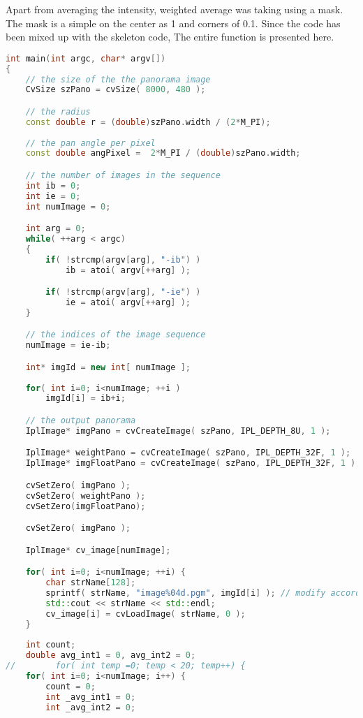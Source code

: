 \documentclass[11pt]{article}
\begin{document}
Apart from averaging the intensity, weighted average was taking using a mask. The mask is a simple on the center as 1 and corners of 0.1. Since the code has been mixed up with the skeleton code, The entire function is presented here.
\begin{lstlisting}[language=C++, caption={ImageBlending}, label=code4]
int main(int argc, char* argv[])
{
    // the size of the the panorama image
    CvSize szPano = cvSize( 8000, 480 );

    // the radius
    const double r = (double)szPano.width / (2*M_PI);
	
    // the pan angle per pixel
    const double angPixel =  2*M_PI / (double)szPano.width;

    // the number of images in the sequence
    int ib = 0;
    int ie = 0;
    int numImage = 0;

    int arg = 0;
    while( ++arg < argc) 
    {
        if( !strcmp(argv[arg], "-ib") )
            ib = atoi( argv[++arg] );

        if( !strcmp(argv[arg], "-ie") )
            ie = atoi( argv[++arg] );
    }	

    // the indices of the image sequence
    numImage = ie-ib;

    int* imgId = new int[ numImage ];
        
    for( int i=0; i<numImage; ++i )
        imgId[i] = ib+i;

    // the output panorama
    IplImage* imgPano = cvCreateImage( szPano, IPL_DEPTH_8U, 1 );

    IplImage* weightPano = cvCreateImage( szPano, IPL_DEPTH_32F, 1 );
    IplImage* imgFloatPano = cvCreateImage( szPano, IPL_DEPTH_32F, 1 );

    cvSetZero( imgPano );
    cvSetZero( weightPano );
    cvSetZero(imgFloatPano);

    cvSetZero( imgPano );

    IplImage* cv_image[numImage];

    for( int i=0; i<numImage; ++i) {
        char strName[128];
        sprintf( strName, "image%04d.pgm", imgId[i] ); // modify according to your image name
        std::cout << strName << std::endl;
        cv_image[i] = cvLoadImage( strName, 0 );
    }
        
    int count;
    double avg_int1 = 0, avg_int2 = 0;
//        for( int temp =0; temp < 20; temp++) {
    for( int i=0; i<numImage; i++) {
        count = 0;
        int _avg_int1 = 0;
        int _avg_int2 = 0;
            

\end{lstlisting}
\end{document}
